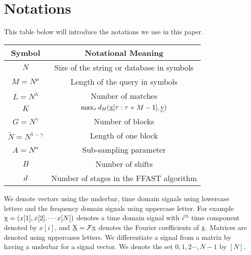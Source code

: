 \section{Notations}

This table below will introduce the notations we use in this paper.

\begin{center}
	
	\begin{tabular}{|c|c|}
		
		\hline
		
		Symbol     &  Notational Meaning \\
		
		\hline
		
		$N$           & Size of the string or database in symbols \\
		\hline
		$M = N^{\mu}$           & Length of the query in symbols \\
		\hline
        $L = N^\lambda$  &   Number of matches \\
        \hline
        $K$             &$\max_{\tau}d_{H}(\underline{\mathrm{x}}[\tau:\tau+M-1],\underline{\mathrm{y}})$\\
        \hline
		$G = N^\gamma$           & Number of blocks \\
		\hline
		$\tilde{N} = N^{1-\gamma}$   & Length of one block \\
		\hline
		$A = N^\alpha$      & Sub-sampling parameter \\
		\hline
		$B$       & Number of shifts  \\
		\hline
		$d$           & Number of stages in the FFAST algorithm \\
		\hline
	\end{tabular}
\end{center}	
	
	\vspace{15pt}


We denote vectors using the underbar, time domain signals using lowercase letters and the frequency domain signals using uppercase letter. For example $\underline{\mathrm{x}} = (x[1],x[2], \cdots x[N] )$ denotes a time domain signal with $i^{th}$ time component denoted by $x[i]$, and $\underline{\mathrm{X}}= \mathcal{F}\underline{\mathrm{x}}$ denotes the Fourier coefficients of $\underline{\mathrm{x}}$. Matrices are denoted using uppercases letters. We differentiate a signal from a matrix by having a underbar for a signal vector. We denote the set ${0,1,2\cdots, N-1}$ by $[N]$.
	
	


